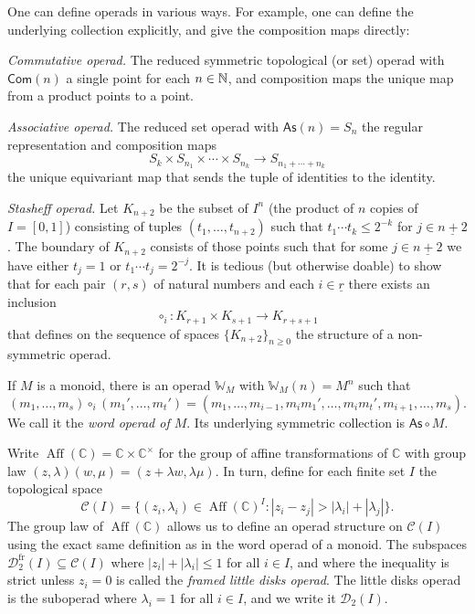 One can define operads in various ways. For example,
one can define the underlying collection explicitly,
and give the composition maps directly:
\begin{tenumerate}
\item \emph{Commutative operad.} The reduced symmetric topological (or set)
operad with $\mathsf{Com}(n)$ a single point for each
$n\in \mathbb N$, and composition maps the unique
map from a product points to a point.
\item \emph{Associative operad.} 
The reduced set operad with
$\mathsf{As}(n) = S_n$
the regular representation and composition maps
\[ S_k \times S_{n_1} \times
\cdots \times S_{n_k} \longrightarrow S_{n_1+\cdots+ n_k} \]
the unique equivariant map that sends the tuple
of identities to the identity.
\item  \emph{Stasheff operad.}
Let $K_{n+2}$ be the subset of $I^n$ (the
product of $n$ copies of $I=[0,1]$) 
consisting of tuples $(t_1,\ldots,t_{n+2})$
such that $t_1\cdots t_k\leqslant 2^{-k}$
for $j\in \underline{n+2}$. The boundary of 
$K_{n+2}$ consists of those points such
that for some $j\in \underline{n+2}$ we have
either $t_j=1$ or $t_1\cdots t_j = 2^{-j}$.
It is tedious (but otherwise doable)
to show that for each pair $(r,s)$ of
natural numbers and each $i\in \underline{r}$
there exists an inclusion
\[ \circ_i : K_{r+1} \times K_{s+1} \longrightarrow
 	K_{r+s+1} \] 
that defines on the sequence of
spaces $\{K_{n+2}\}_{n\geqslant 0}$
the structure of a non-symmetric operad.

\item If $M$ is a monoid, there is an
operad $\mathbb W_M$ with $\mathbb{W}_M(n) =
M^n$ such that 
\[(m_1,\ldots,m_s) \circ_i (m_1',\ldots,m_t') = 
 	(m_1,\ldots,m_{i-1}, m_im_1',\ldots,m_im_t',m_{i+1},\ldots, m_s).\] We call it the
 \emph{word operad of $M$}. Its underlying
 symmetric collection is $\mathsf{As}\circ M$. 
 
 \item Write $\operatorname{Aff}(\mathbb C) = \mathbb{C}\times \mathbb{C}^\times$ for the group of affine transformations of
$\mathbb C$ with group law $(z,\lambda)(w,\mu) = (z+\lambda w,\lambda\mu)$. In turn, define for each finite set $I$ the topological space
\[ \mathcal{C}(I) = \{ (z_i,\lambda_i)\in \operatorname{Aff}(\mathbb C)^I  : |z_i-z_j|>|\lambda_i|+|\lambda_j| \}.\] 
The group law of $\operatorname{Aff}(\mathbb C)$ allows us to
define an operad structure on $\mathcal{C}(I)$ using the
exact same definition as in the word operad of a monoid. 
The subspaces $\mathcal{D}_2^{\mathrm{fr}}(I)
	\subseteq \mathcal{C}(I)$
where $|z_i|+|\lambda_i|\leqslant 1$ for all $i\in I$, and 
where the inequality is strict unless $z_i=0$ is called
the \emph{framed little disks operad}. The little disks operad
is the suboperad where $\lambda_i = 1$ for all $i\in I$, and 
we write it $\mathcal{D}_2(I)$.


\end{tenumerate}
